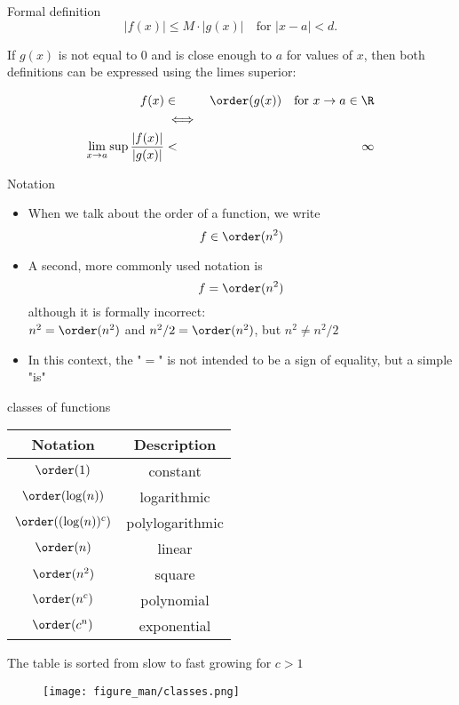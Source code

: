 \documentclass[11pt,compress,t,notes=noshow, xcolor=table]{beamer}
\begin{document}
\begin{vbframe}{Formal definition}
$$
|f(x)| \leq M \cdot |g(x)| \quad \text{for } |x-a| < d.
$$

\framebreak

  If $g(x)$ is not equal to 0 and is close enough to $a$ for values of $x$, then both definitions can be expressed using the limes superior:

\begin{eqnarray*}
  f(x) &\in& \order(g(x)) \quad \text{for } x \to a \in \R \\
  &\iff& \\
  \lim_{x \rightarrow a} \sup \frac{|f(x)|}{|g(x)|} &<& \infty\\
\end{eqnarray*}

\end{vbframe}

\begin{vbframe}{Notation}

  \begin{itemize}
    \item When we talk about the order of a function, we write
    $$f \in \order(n^2)$$
    \item A second, more commonly used notation is
        $$f = \order(n^2)$$
        although it is formally incorrect:\\
    $n^2 = \order(n^2)$ and $n^2/2 = \order(n^2)$, but $n^2 \neq n^2/2$
    \item In this context, the "$=$" is not intended to be a sign of equality, but a simple "is"
  \end{itemize}
\end{vbframe}

\begin{vbframe}{classes of functions}

\begin{center}
  \begin{tabular}{ c | c}
  Notation & Description \\
  \hline
  $\order(1)$ & constant \\
  $\order(\log(n))$ & logarithmic \\
  $\order((\log(n))^c)$ & polylogarithmic \\
  $\order(n)$ & linear \\
  $\order(n^2)$ & square \\
  $\order(n^c)$ & polynomial \\
  $\order(c^n)$ & exponential
  \end{tabular}
\end{center}

The table is sorted from slow to fast growing for $c > 1$

\framebreak

\lz

\begin{center}
\begin{figure}
  \texttt{[image: figure\_man/classes.png]}
\end{figure}
\end{center}

\end{vbframe}

\endlecture
\end{document}
